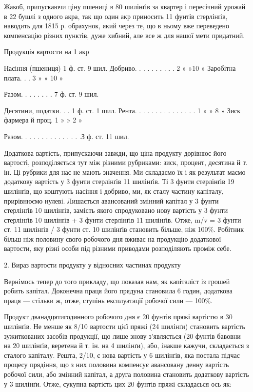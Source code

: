 Жакоб, припускаючи ціну пшениці в 80 шилінґів за квартер і пересічний урожай в 22 бушлі з одного
акра, так що один акр приносить 11 фунтів стерлінґів, наводить для 1815 р. обрахунок, який через те,
що в ньому вже переведено компенсацію різних
пунктів, дуже хибний, але все ж для нашої мети придатний.

Продукція вартости на 1 акр

Насіння (пшениця) 1 ф. ст. 9 шил.
Добриво. . . . . . . . . . 2  » »10 »
Заробітна плата. . . 3 » »  10 »

Разом. . . . . . .  . 7 ф. ст. 9 шил.

Десятини, податки. . . 1 ф. ст. 1 шил.
Рента. . . . . . . . . . . . . . . 1 » » 8 »
Зиск фармера й проц. 1 » » 2 »

Разом. . . . . . . . . . . . . . .З ф. ст. 11 шил.

Додаткова вартість, припускаючи завжди, що ціна продукту дорівнює його вартості, розподіляється тут
між різними рубриками: зиск, процент, десятина й т. ін. Ці рубрики для нас не мають значення. Ми
складаємо їх і як результат маємо додаткову вартість у 3 фунти стерлінґів 11 шилінґів. Ті 3 фунти
стерлінґів 19 шилінґів, що коштують насіння і добриво, ми, як сталу частину капіталу, прирівнюємо
нулеві. Лишається авансований змінний капітал у 3 фунти стерлінґів 10 шилінґів, замість якого
спродуковано нову вартість у 3 фунти стерлінґів 10 шилінґів + 3 фунти стерлінґів 11 шилінґів. Отже,
m/v = 3 фунти ст. 11 шилінґів / 3 фунти ст. 10 шилінґів становить більше, ніж 100\%. Робітник більш
ніж половину свого робочого дня вживає на продукцію додаткової вартости, яку різні особи під різними
приводами  розподіляють проміж себе.

2. Вираз вартости продукту у відносних частинах продукту

Вернімось тепер до того прикладу, що показав нам, як капіталіст із грошей робить капітал. Доконечна
праця його прядуна
становила 6 годин, додаткова праця — стільки ж, отже, ступінь експлуатації робочої сили — 100\%.

Продукт дванадцятигодинного робочого дня є 20 фунтів пряжі вартістю в 30 шилінґів. Не менше як 8/10
вартости цієї пряжі (24 шилінґи) становить вартість зужиткованих засобів продукції, що лише знову
з’являється (20 фунтів бавовни на 20 шилінґів, веретена й т. ін. на 4 шилінґи), або, інакше кажучи,
складається з сталого капіталу. Решта, 2/10, є нова вартість у 6 шилінґів, яка постала підчас
процесу прядіння, що з них половина компенсує авансовану денну вартість робочої сили, або змінний
капітал, а друга половина становить додаткову вартість у 3 шилінґи. Отже, сукупна вартість цих 20
фунтів пряжі складаєься ось як:
